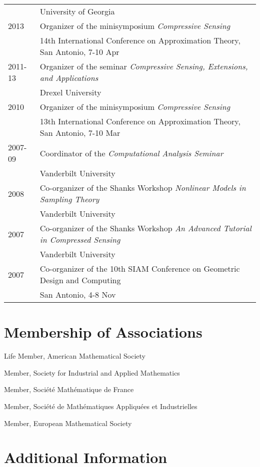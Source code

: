 \documentclass[11pt]{article}
\begin{document}
\begin{tabular}{ll}
& University of Georgia\\
2013 & Organizer of the minisymposium {\sl Compressive Sensing}\\
& 14th International Conference on Approximation Theory, San Antonio, 7-10 Apr\\
2011-13 & Organizer of the seminar {\sl Compressive Sensing, Extensions, and Applications}\\
& Drexel University\\
2010 & Organizer of the minisymposium {\sl Compressive Sensing}\\
& 13th International Conference on Approximation Theory, San Antonio, 7-10 Mar\\
2007-09 & Coordinator of the {\sl Computational Analysis Seminar}\\
& Vanderbilt University\\
2008 & Co-organizer of the Shanks Workshop {\sl Nonlinear Models in Sampling Theory}\\
& Vanderbilt University\\
2007 & Co-organizer of the Shanks Workshop {\sl An Advanced Tutorial in Compressed Sensing}\\
& Vanderbilt University\\
2007 &  Co-organizer of the 10th SIAM Conference on Geometric Design and Computing\\
& San Antonio, 4-8 Nov
\end{tabular}



\section{Membership of Associations}

\bitemize
\item Life Member, American Mathematical Society
\item Member, Society for Industrial and Applied Mathematics
\item Member, Soci\'{e}t\'{e} Math\'{e}matique de France
\item Member, Soci\'et\'e de Math\'ematiques Appliqu\'ees et Industrielles
\item Member, European Mathematical Society
\eitemize


\section{Additional Information}
\end{document}
